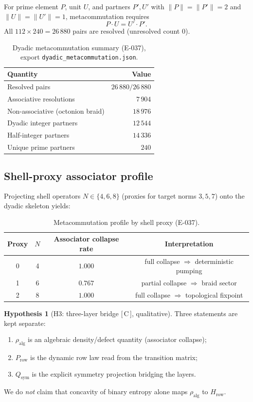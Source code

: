 \documentclass[11pt, lettersize, article]{article}
\theoremstyle{definition}
\newtheorem{hypothesis}[theorem]{Hypothesis}
\theoremstyle{remark}
\newcommand{\evidence}[1]{\textnormal{[\,#1\,]}}
\begin{document}
For prime element $P$, unit $U$, and partners $P',U'$ with $\|P\|=\|P'\|=2$ and $\|U\|=\|U'\|=1$, metacommutation requires
\[
  P \cdot U = U' \cdot P'.
\]
All $112 \times 240 = 26\,880$ pairs are resolved (unresolved count $0$).

\begin{table}[htbp]
\centering
\caption{Dyadic metacommutation summary (E-037), export \texttt{dyadic\_metacommutation.json}.}
\label{tab:metacommutation-summary}
\begin{tabular}{l r}
\toprule
Quantity & Value \\
\midrule
Resolved pairs & $26\,880 / 26\,880$ \\
Associative resolutions & $7\,904$ \\
Non-associative (octonion braid) & $18\,976$ \\
Dyadic integer partners & $12\,544$ \\
Half-integer partners & $14\,336$ \\
Unique prime partners & $240$ \\
\bottomrule
\end{tabular}
\end{table}

\subsection{Shell-proxy associator profile}

Projecting shell operators $N\in\{4,6,8\}$ (proxies for target norms $3,5,7$) onto the dyadic skeleton yields:

\begin{table}[htbp]
\centering
\caption{Metacommutation profile by shell proxy (E-037).}
\label{tab:shell-associator}
\begin{tabular}{c c c c}
\toprule
Proxy & $N$ & Associator collapse rate & Interpretation \\
\midrule
0 & 4 & $1.000$ & full collapse $\Rightarrow$ deterministic pumping \\
1 & 6 & $0.767$ & partial collapse $\Rightarrow$ braid sector \\
2 & 8 & $1.000$ & full collapse $\Rightarrow$ topological fixpoint \\
\bottomrule
\end{tabular}
\end{table}

\begin{hypothesis}[H3: three-layer bridge \evidence{C}, qualitative]
\label{hyp:h3}
Three statements are kept separate:
\begin{enumerate}
  \item $\rho_{\mathrm{alg}}$ is an algebraic density/defect quantity (associator collapse);
  \item $P_{\mathrm{row}}$ is the dynamic row law read from the transition matrix;
  \item $Q_{\mathrm{sym}}$ is the explicit symmetry projection bridging the layers.
\end{enumerate}
We do \emph{not} claim that concavity of binary entropy alone maps $\rho_{\mathrm{alg}}$ to $H_{\mathrm{row}}$.
\end{hypothesis}
\end{document}
